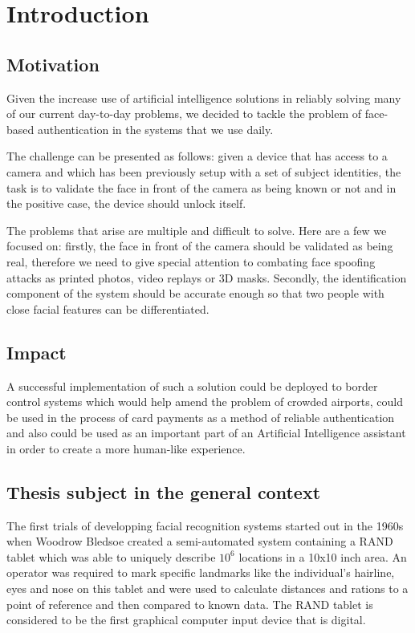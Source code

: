 \chapter{Introduction}

\section{Motivation}

Given the increase use of artificial intelligence solutions in reliably solving many of our current day-to-day problems, we decided to tackle the problem of face-based authentication in the systems that we use daily.

The challenge can be presented as follows: given a device that has access to a camera and which has been previously setup with a set of subject identities, the task is to validate the face in front of the camera as being known or not and in the positive case, the device should unlock itself.

The problems that arise are multiple and difficult to solve. Here are a few we focused on: firstly, the face in front of the camera should be validated as being real, therefore we need to give special attention to combating face spoofing attacks as printed photos, video replays or 3D masks. Secondly, the identification component of the system should be accurate enough so that two people with close facial features can be differentiated.

\section{Impact}
A successful implementation of such a solution could be deployed to border control systems which would help amend the problem of crowded airports, could be used in the process of card payments as a method of reliable authentication and also could be used as an important part of an Artificial Intelligence assistant in order to create a more human-like experience.

\section{Thesis subject in the general context}
The first trials of developping facial recognition systems started out in the 1960s when Woodrow Bledsoe created a semi-automated system \cite{DavisMRETO64} containing a RAND tablet which was able to uniquely describe $10^{6}$ locations in a 10x10 inch area.
An operator was required to mark specific landmarks like the individual's  hairline, eyes and nose on this tablet and were used to calculate distances and rations to a point of reference and then compared to known data. The RAND tablet is considered to be the first graphical computer input device that is digital.

